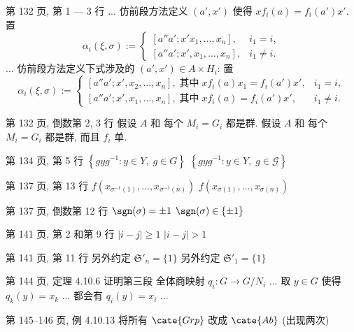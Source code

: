 \documentclass{AJerrata}
\begin{document}
\begin{Errata}
		\item[第 132 页, 第 1 --- 3 行]
		\Orig ... 仿前段方法定义 $(a', x')$ 使得 $x f_i(a) = f_i(a')x'$. 置
		\[ \alpha_i(\xi, \sigma) :=
		\begin{cases}
			[a'' a'; x'x_1, \ldots, x_n], & i_1 = i, \\
			[a'' a'; x', x_1, \ldots, x_n], & i_1 \neq i.
		\end{cases} \]
		\Corr ... 仿前段方法定义下式涉及的 $(a', x') \in A \times H_i$: 置
		\[ \alpha_i(\xi, \sigma) :=
		\begin{cases}
			[a'' a'; x', x_2, \ldots, x_n], \;\text{其中}\; x f_i(a) x_1 = f_i(a') x', & i_1 = i, \\
			[a'' a'; x', x_1, \ldots, x_n], \;\text{其中}\; x f_i(a) = f_i(a') x', & i_1 \neq i.
		\end{cases} \]
		
		\item[第 132 页, 倒数第 2, 3 行]
		\Orig 假设 $A$ 和 每个 $M_i = G_i$ 都是群.
		\Corr 假设 $A$ 和 每个 $M_i = G_i$ 都是群, 而且 $f_i$ 单.
		
		\item[第 134 页, 第 5 行]
		\Orig $\left\{ gyg^{-1}: y \in Y, \; g \in G \right\}$
		\Corr $\left\{ gyg^{-1}: y \in Y, \; g \in \mathcal{G} \right\}$

		\item[第 137 页, 第 13 行]
		\Orig $f(x_{\sigma^{-1}(1)}, \ldots, x_{\sigma^{-1}(n)})$
		\Corr $f(x_{\sigma(1)}, \ldots, x_{\sigma(n)})$

		\item[第 137 页, 倒数第 12 行]
		\Orig $\sgn(\sigma) = \pm 1$
		\Corr $\sgn(\sigma) \in \{\pm 1\}$

		\item[第 141 页, 第 2 和第 9 行]
		\Orig $|i - j| \geq 1$
		\Corr $|i - j| > 1$

        \item[第 141 页, 第 11 行]
        \Orig 另外约定 $\mathfrak{S}'_n = \{1\}$
        \Corr 另外约定 $\mathfrak{S}'_1 = \{1\}$

		\item[第 144 页, 定理 4.10.6 证明第三段]
		全体商映射 $q_i: G \to G/N_i$ ... 取 $y \in G$ 使得 $q_k(y) = x_k$ ... 都会有 $q_i(y) = x_i$ ...

		\item[第 145--146 页, 例 4.10.13]
		将所有 $\cate{Grp}$ 改成 $\cate{Ab}$ (出现两次)


\end{Errata}
\end{document}
